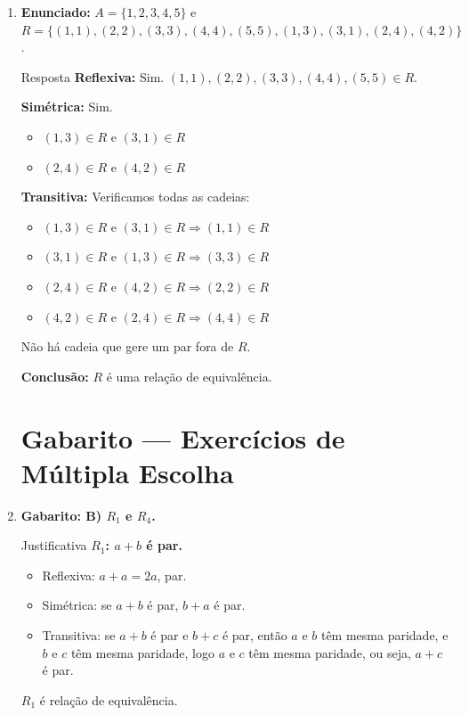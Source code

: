 \documentclass[12pt]{article}
\begin{document}
\begin{enumerate}
\item \textbf{Enunciado:} $A = \{1,2,3,4,5\}$ e $R = \{(1,1),(2,2),(3,3),(4,4),(5,5),(1,3),(3,1),(2,4),(4,2)\}$.

\begin{block}{Resposta}
\textbf{Reflexiva:} Sim. $(1,1), (2,2), (3,3), (4,4), (5,5) \in R$.

\textbf{Simétrica:} Sim.
\begin{itemize}
    \item $(1,3) \in R$ e $(3,1) \in R$ \checkmark
    \item $(2,4) \in R$ e $(4,2) \in R$ \checkmark
\end{itemize}

\textbf{Transitiva:} Verificamos todas as cadeias:
\begin{itemize}
    \item $(1,3) \in R$ e $(3,1) \in R \Rightarrow (1,1) \in R$ \checkmark
    \item $(3,1) \in R$ e $(1,3) \in R \Rightarrow (3,3) \in R$ \checkmark
    \item $(2,4) \in R$ e $(4,2) \in R \Rightarrow (2,2) \in R$ \checkmark
    \item $(4,2) \in R$ e $(2,4) \in R \Rightarrow (4,4) \in R$ \checkmark
\end{itemize}
Não há cadeia que gere um par fora de $R$.

\textbf{Conclusão:} $R$ é uma relação de equivalência.
\end{block}

\newpage

\section*{Gabarito — Exercícios de Múltipla Escolha}

\item \textbf{Gabarito: B) $R_1$ e $R_4$.}

\begin{block}{Justificativa}
\textbf{$R_1$: $a + b$ é par.}
\begin{itemize}
    \item Reflexiva: $a + a = 2a$, par. \checkmark
    \item Simétrica: se $a+b$ é par, $b+a$ é par. \checkmark
    \item Transitiva: se $a+b$ é par e $b+c$ é par, então $a$ e $b$ têm mesma paridade, e $b$ e $c$ têm mesma paridade, logo $a$ e $c$ têm mesma paridade, ou seja, $a+c$ é par. \checkmark
\end{itemize}
$R_1$ é relação de equivalência.


\end{block}
\end{enumerate}
\end{document}
